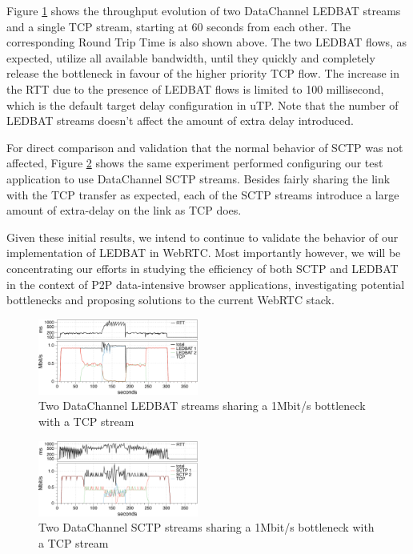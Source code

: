 \documentclass{sig-alternate}
\begin{document}
Figure \ref{fig:2ledbat_tcp} shows the throughput evolution of two DataChannel LEDBAT
streams and a single TCP stream, starting at 60 seconds from each other. The corresponding
Round Trip Time is also shown above. The two LEDBAT flows, as expected, utilize all
available bandwidth, until they quickly and completely release the bottleneck in favour of
the higher priority TCP flow. The increase in the RTT due to the presence of LEDBAT flows
is limited to 100 millisecond, which is the default target delay configuration in
uTP. Note that the number of LEDBAT streams doesn't affect the amount of extra delay
introduced.


For direct comparison and validation that the normal behavior of SCTP was not affected,
Figure \ref{fig:2sctp_tcp} shows the same experiment performed configuring our test
application to use DataChannel SCTP streams. Besides fairly sharing the link with the TCP
transfer as expected, each of the SCTP streams introduce a large amount of extra-delay on
the link as TCP does.

Given these initial results, we intend to continue to validate the behavior of our
implementation of LEDBAT in WebRTC. Most importantly however, we will be concentrating our
efforts in studying the efficiency of both SCTP and LEDBAT in the context of P2P
data-intensive browser applications, investigating potential bottlenecks and proposing
solutions to the current WebRTC stack.
\begin{figure}[t]
  \centering
    \includegraphics[width=0.47\textwidth]{figs/2ledbat_tcp}
\vspace*{-0.38cm}
	\caption{Two DataChannel LEDBAT streams sharing a 1Mbit/s bottleneck with a TCP stream} \label{fig:2ledbat_tcp}
\end{figure}

\begin{figure}[t]
  \centering
    \includegraphics[width=0.47\textwidth]{figs/2sctp_tcp}
\vspace*{-0.38cm}
	\caption{Two DataChannel SCTP  streams sharing a 1Mbit/s bottleneck with a TCP stream} \label{fig:2sctp_tcp}
\vspace*{-0.4cm}
\end{figure}



\end{document}
